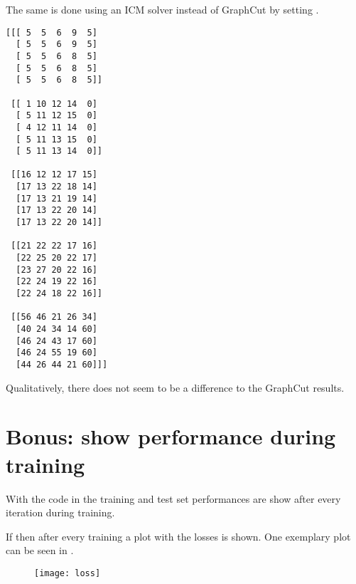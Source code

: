 \documentclass[12pt]{scrartcl}
\begin{document}
The same is done using an ICM solver instead of GraphCut by setting .

\begin{verbatim}
[[[ 5  5  6  9  5]
  [ 5  5  6  9  5]
  [ 5  5  6  8  5]
  [ 5  5  6  8  5]
  [ 5  5  6  8  5]]

 [[ 1 10 12 14  0]
  [ 5 11 12 15  0]
  [ 4 12 11 14  0]
  [ 5 11 13 15  0]
  [ 5 11 13 14  0]]

 [[16 12 12 17 15]
  [17 13 22 18 14]
  [17 13 21 19 14]
  [17 13 22 20 14]
  [17 13 22 20 14]]

 [[21 22 22 17 16]
  [22 25 20 22 17]
  [23 27 20 22 16]
  [22 24 19 22 16]
  [22 24 18 22 16]]

 [[56 46 21 26 34]
  [40 24 34 14 60]
  [46 24 43 17 60]
  [46 24 55 19 60]
  [44 26 44 21 60]]]
\end{verbatim}

Qualitatively, there does not seem to be a difference to the GraphCut results.

\section{Bonus: show performance during training}

With the code in  the training and test set performances are show after every iteration during training.

If  then after every training a plot with the losses is shown. One exemplary plot can be seen in .

\begin{figure}
    \centering
    \texttt{[image: loss]}
    \label{fig:bonus}
\end{figure}





\clearpage

\end{document}

